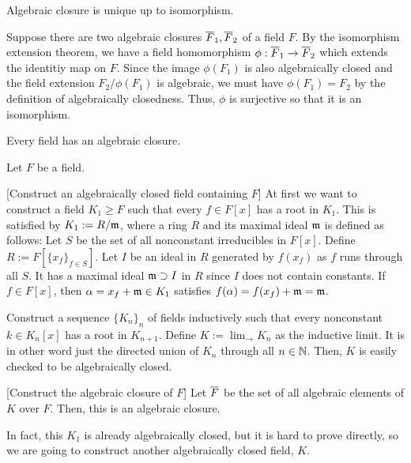 \documentclass{../exp}
\begin{document}
\begin{thm}
Algebraic closure is unique up to isomorphism.
\end{thm}
\begin{pf}
Suppose there are two algebraic closures $\overline F_1, \overline F_2$ of a field $F$.
By the isomorphism extension theorem, we have a field homomorphism $\phi:\cl F_1\to\cl F_2$ which extends the identitiy map on $F$.
Since the image $\phi(F_1)$ is also algebraically closed and the field extension $F_2/\phi(F_1)$ is algebraic, we must have $\phi(F_1)=F_2$ by the definition of algebraically closedness.
Thus, $\phi$ is surjective so that it is an isomorphism.
\end{pf}

\begin{thm}
Every field has an algebraic closure.
\end{thm}
\begin{pf}
Let $F$ be a field.

[Construct an algebraically closed field containing $F$]
At first we want to construct a field $K_1\ge F$ such that every $f\in F[x]$ has a root in $K_1$.
This is satisfied by $K_1:=R/\mathfrak{m}$, where a ring $R$ and its maximal ideal $\mathfrak{m}$ is defined as follows:
Let $S$ be the set of all nonconstant irreducibles in $F[x]$.
Define $R:=F[\{x_f\}_{f\in S}]$.
Let $I$ be an ideal in $R$ generated by $f(x_f)$ as $f$ runs through all $S$.
It has a maximal ideal $\mathfrak{m}\supset I$ in $R$ since $I$ does not contain constants.
If $f\in F[x]$, then $\alpha=x_f+\mathfrak{m}\in K_1$ satisfies $f(\alpha)=f(x_f)+\mathfrak{m}=\mathfrak{m}$.

Construct a sequence $\{K_n\}_n$ of fields inductively such that every nonconstant $k\in K_n[x]$ has a root in $K_{n+1}$.
Define $K:=\lim_{\to}K_n$ as the inductive limit.
It is in other word just the directed union of $K_n$ through all $n\in\mathbb{N}$.
Then, $K$ is easily checked to be algebraically closed.

[Construct the algebraic closure of $F$]
Let $\overline F$ be the set of all algebraic elements of $K$ over $F$.
Then, this is an algebraic closure.
\end{pf}
\begin{rmk}
In fact, this $K_1$ is already algebraically closed, but it is hard to prove directly, so we are going to construct another algebraically closed field, $K$.
\end{rmk}
\end{document}
